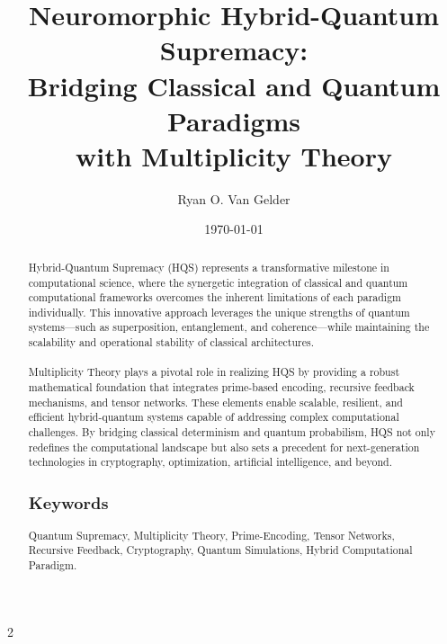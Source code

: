 \documentclass{article}
\theoremstyle{plain}
\begin{document}
\title{Neuromorphic Hybrid-Quantum Supremacy: \\ Bridging Classical and Quantum Paradigms \\ with Multiplicity Theory}

\author{Ryan O. Van Gelder}
\date{\today}
\maketitle

\begin{abstract}
Hybrid-Quantum Supremacy (HQS) represents a transformative milestone in computational science, where the synergetic integration of classical and quantum computational frameworks overcomes the inherent limitations of each paradigm individually. This innovative approach leverages the unique strengths of quantum systems—such as superposition, entanglement, and coherence—while maintaining the scalability and operational stability of classical architectures. 

\paragraph{}Multiplicity Theory plays a pivotal role in realizing HQS by providing a robust mathematical foundation that integrates prime-based encoding, recursive feedback mechanisms, and tensor networks. These elements enable scalable, resilient, and efficient hybrid-quantum systems capable of addressing complex computational challenges. By bridging classical determinism and quantum probabilism, HQS not only redefines the computational landscape but also sets a precedent for next-generation technologies in cryptography, optimization, artificial intelligence, and beyond.

\subsection*{Keywords}
Quantum Supremacy, Multiplicity Theory, Prime-Encoding, Tensor Networks, Recursive Feedback, Cryptography, Quantum Simulations, Hybrid Computational Paradigm.

\end{abstract}
\newpage
\begin{multicols}{2}
\begin{singlespace}
\tableofcontents
\end{singlespace}
\end{multicols}
\end{document}
